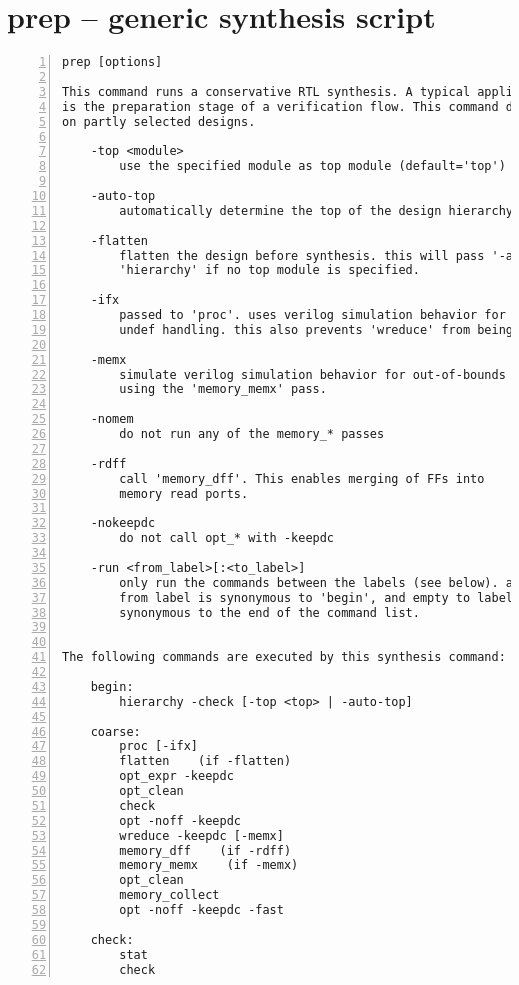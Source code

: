 \section{prep -- generic synthesis script}
\label{cmd:prep}
\begin{lstlisting}[numbers=left,frame=single]
    prep [options]

This command runs a conservative RTL synthesis. A typical application for this
is the preparation stage of a verification flow. This command does not operate
on partly selected designs.

    -top <module>
        use the specified module as top module (default='top')

    -auto-top
        automatically determine the top of the design hierarchy

    -flatten
        flatten the design before synthesis. this will pass '-auto-top' to
        'hierarchy' if no top module is specified.

    -ifx
        passed to 'proc'. uses verilog simulation behavior for verilog if/case
        undef handling. this also prevents 'wreduce' from being run.

    -memx
        simulate verilog simulation behavior for out-of-bounds memory accesses
        using the 'memory_memx' pass.

    -nomem
        do not run any of the memory_* passes

    -rdff
        call 'memory_dff'. This enables merging of FFs into
        memory read ports.

    -nokeepdc
        do not call opt_* with -keepdc

    -run <from_label>[:<to_label>]
        only run the commands between the labels (see below). an empty
        from label is synonymous to 'begin', and empty to label is
        synonymous to the end of the command list.


The following commands are executed by this synthesis command:

    begin:
        hierarchy -check [-top <top> | -auto-top]

    coarse:
        proc [-ifx]
        flatten    (if -flatten)
        opt_expr -keepdc
        opt_clean
        check
        opt -noff -keepdc
        wreduce -keepdc [-memx]
        memory_dff    (if -rdff)
        memory_memx    (if -memx)
        opt_clean
        memory_collect
        opt -noff -keepdc -fast

    check:
        stat
        check
\end{lstlisting}

